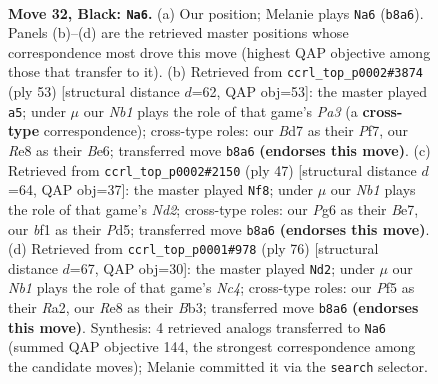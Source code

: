 \documentclass[11pt]{article}
\begin{document}
\clearpage

\begin{figure}[p]\centering
\begin{subfigure}{0.46\textwidth}\centering
\resizebox{\linewidth}{!}{%
\newchessgame
\chessboard[
  setfen={1n2r1k1/3b1p1p/2q3p1/4Pp2/p4P2/7N/PQP2KPP/5B1R b - - 1 32},
  showmover=false,
  pgfstyle=straightmove, color=movearrow, markmove={b8-a6}
]}
\caption{}
\end{subfigure}\hfill
\begin{subfigure}{0.46\textwidth}\centering
\resizebox{\linewidth}{!}{%
\newchessgame
\chessboard[
  setfen={3r2k1/1pq2pp1/p3bn1p/4p3/PP6/2P1N2P/2Q1BPP1/4R1K1 b - - 0 27},
  showmover=false,
  pgfstyle=straightmove, color=movearrow, markmove={a6-a5}
]}
\caption{}
\end{subfigure}
\\[4pt]
\begin{subfigure}{0.46\textwidth}\centering
\resizebox{\linewidth}{!}{%
\newchessgame
\chessboard[
  setfen={r5k1/3nbpp1/pq5p/1p1pPB2/8/P1P2N1P/4QPP1/R5K1 b - - 0 24},
  showmover=false,
  pgfstyle=straightmove, color=movearrow, markmove={d7-f8}
]}
\caption{}
\end{subfigure}\hfill
\begin{subfigure}{0.46\textwidth}\centering
\resizebox{\linewidth}{!}{%
\newchessgame
\chessboard[
  setfen={4rb2/5nk1/p1p1q1p1/P4p1p/2NP3P/1BP2QP1/R5K1/8 w - - 2 39},
  showmover=false,
  pgfstyle=straightmove, color=movearrow, markmove={c4-d2}
]}
\caption{}
\end{subfigure}
\caption{\textbf{Move 32, Black: \texttt{Na6}.} (a) Our position; Melanie plays \texttt{Na6} (\texttt{b8a6}). Panels (b)--(d) are the retrieved master positions whose correspondence most drove this move (highest QAP objective among those that transfer to it). (b) Retrieved from \texttt{ccrl\_top\_p0002\#3874} (ply 53) [structural distance $d$=62, QAP obj=53]: the master played \texttt{a5}; under $\mu$ our \emph{Nb1} plays the role of that game's \emph{Pa3} (a \textbf{cross-type} correspondence); cross-type roles: our \emph{B}d7 as their \emph{P}f7, our \emph{R}e8 as their \emph{B}e6; transferred move \texttt{b8a6} \textbf{(endorses this move)}. (c) Retrieved from \texttt{ccrl\_top\_p0002\#2150} (ply 47) [structural distance $d$=64, QAP obj=37]: the master played \texttt{Nf8}; under $\mu$ our \emph{Nb1} plays the role of that game's \emph{Nd2}; cross-type roles: our \emph{P}g6 as their \emph{B}e7, our \emph{b}f1 as their \emph{P}d5; transferred move \texttt{b8a6} \textbf{(endorses this move)}. (d) Retrieved from \texttt{ccrl\_top\_p0001\#978} (ply 76) [structural distance $d$=67, QAP obj=30]: the master played \texttt{Nd2}; under $\mu$ our \emph{Nb1} plays the role of that game's \emph{Nc4}; cross-type roles: our \emph{P}f5 as their \emph{R}a2, our \emph{R}e8 as their \emph{B}b3; transferred move \texttt{b8a6} \textbf{(endorses this move)}. Synthesis: 4 retrieved analogs transferred to \texttt{Na6} (summed QAP objective 144, the strongest correspondence among the candidate moves); Melanie committed it via the \texttt{search} selector.}
\label{fig:thought-m63}
\end{figure}
\end{document}
